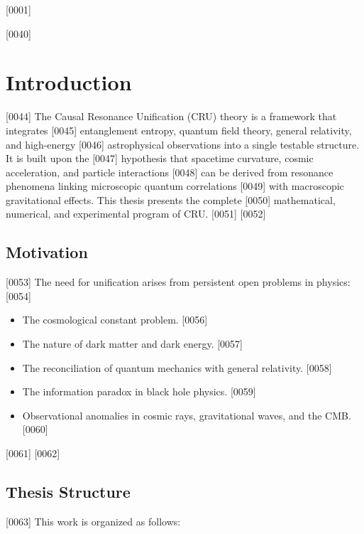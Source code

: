 [0001] \documentclass[12pt]{report}
[0002] \usepackage[utf8]{inputenc}
\begin{document}
[0040] \maketitle
[0041] \tableofcontents
[0042] 
[0043] \chapter{Introduction}
[0044] The Causal Resonance Unification (CRU) theory is a framework that integrates
[0045] entanglement entropy, quantum field theory, general relativity, and high-energy
[0046] astrophysical observations into a single testable structure. It is built upon the
[0047] hypothesis that spacetime curvature, cosmic acceleration, and particle interactions
[0048] can be derived from resonance phenomena linking microscopic quantum correlations
[0049] with macroscopic gravitational effects. This thesis presents the complete
[0050] mathematical, numerical, and experimental program of CRU.
[0051] 
[0052] \section{Motivation}
[0053] The need for unification arises from persistent open problems in physics:
[0054] \begin{itemize}
[0055]   \item The cosmological constant problem.
[0056]   \item The nature of dark matter and dark energy.
[0057]   \item The reconciliation of quantum mechanics with general relativity.
[0058]   \item The information paradox in black hole physics.
[0059]   \item Observational anomalies in cosmic rays, gravitational waves, and the CMB.
[0060] \end{itemize}
[0061] 
[0062] \section{Thesis Structure}
[0063] This work is organized as follows:
\end{document}
